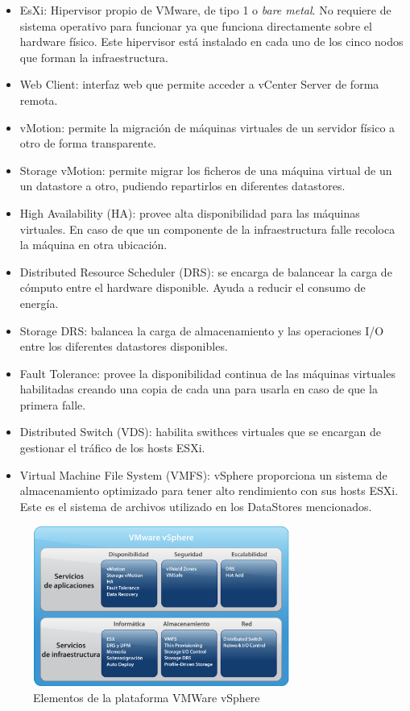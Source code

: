 \begin{itemize}
    \item EsXi: Hipervisor propio de VMware, de tipo 1 o \textit{bare metal}. No requiere de sistema operativo para funcionar ya que funciona directamente sobre el hardware físico\cite{Esxi}. Este hipervisor está instalado en cada uno de los cinco nodos que forman la infraestructura.
    \item Web Client: interfaz web que permite acceder a vCenter Server de forma remota.
    \item vMotion: permite la migración de máquinas virtuales de un servidor físico a otro de forma transparente.
    \item Storage vMotion: permite migrar los ficheros de una máquina virtual de un un datastore a otro, pudiendo repartirlos en diferentes datastores.
    \item High Availability (HA): provee alta disponibilidad para las máquinas virtuales. En caso de que un componente de la infraestructura falle recoloca la máquina en otra ubicación.
    \item Distributed Resource Scheduler (DRS): se encarga de balancear la carga de cómputo entre el hardware disponible. Ayuda a reducir el consumo de energía.
    \item Storage DRS: balancea la carga de almacenamiento y las operaciones I/O entre los diferentes datastores disponibles.
    \item Fault Tolerance: provee la disponibilidad continua de las máquinas virtuales habilitadas creando una copia de cada una  para usarla en caso de que la primera falle.
    \item Distributed Switch (VDS): habilita swithces virtuales que se encargan de gestionar el tráfico de los hosts ESXi.
    \item Virtual Machine File System (VMFS): vSphere proporciona un sistema de almacenamiento optimizado para tener alto rendimiento con sus hosts ESXi. Este es el sistema de archivos utilizado en los DataStores mencionados.
\end{itemize}

\begin{figure}[hp!]
  \centering
  \includegraphics[width=0.75\textwidth]{imaxes/cap2recursos/contentVSphere}
  \caption{Elementos de la plataforma VMWare vSphere\cite{fotovSphere}}
  \label{fig:componentesVSphere}
\end{figure}

